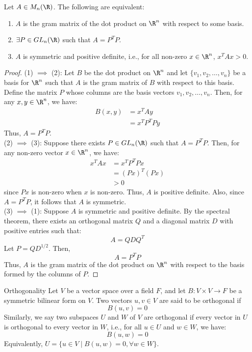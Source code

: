 \documentclass[openany]{book}
\begin{document}
\begin{mytheorem}
    Let $A \in M_n(\R)$. The following are equivalent:
    \begin{enumerate}
        \item $A$ is the gram matrix of the dot product on $\R^n$ with respect to some basis.
        \item $\exists P \in GL_n(\R)$ such that $A = P^TP$.
        \item $A$ is symmetric and positive definite, i.e., for all non-zero $x \in \R^n$, $x^TAx > 0$.
    \end{enumerate}
\end{mytheorem}
\begin{proof}
    (1) $\implies$ (2): Let $B$ be the dot product on $\R^n$ and let $\{v_1, v_2, \ldots, v_n\}$ be a basis for $\R^n$ such that $A$ is the gram matrix of $B$ with respect to this basis. Define the matrix $P$ whose columns are the basis vectors $v_1, v_2, \ldots, v_n$. Then, for any $x, y \in \R^n$, we have:
    \[\begin{aligned}
    B(x, y) &= x^T A y \\
    &= x^T P^T P y
    \end{aligned}\]
    Thus, $A = P^T P$. \\
    (2) $\implies$ (3): Suppose there exists $P \in GL_n(\R)$ such that $A = P^T P$. Then, for any non-zero vector $x \in \R^n$, we have:
    \[\begin{aligned}
    x^T A x &= x^T P^T P x \\
    &= (Px)^T (Px) \\
    &> 0
    \end{aligned}\]
    since $Px$ is non-zero when $x$ is non-zero. Thus, $A$ is positive definite. Also, since $A = P^T P$, it follows that $A$ is symmetric. \\
    (3) $\implies$ (1): Suppose $A$ is symmetric and positive definite. By the spectral theorem, there exists an orthogonal matrix $Q$ and a diagonal matrix $D$ with positive entries such that:
    $$A = Q D Q^T$$
    Let $P = Q D^{1/2}$. Then,
    $$A = P^T P$$
    Thus, $A$ is the gram matrix of the dot product on $\R^n$ with respect to the basis formed by the columns of $P$.
\end{proof}
\begin{mydefinition}{Orthogonality}
Let $V$ be a vector space over a field $F$, and let $B: V \times V \to F$ be a symmetric bilinear form on $V$. Two vectors $u, v \in V$ are said to be orthogonal
if $$B(u, v) = 0$$
Similarly, we say two subspaces $U$ and $W$ of $V$ are orthogonal if every vector in $U$ is orthogonal to every vector in $W$, i.e., for all $u \in U$ and $w \in W$, we have:
$$B(u, w) = 0$$
Equivalently, $U = \{u \in V \mid B(u, w) = 0, \forall w \in W\}$. 
\end{mydefinition}
\end{document}
